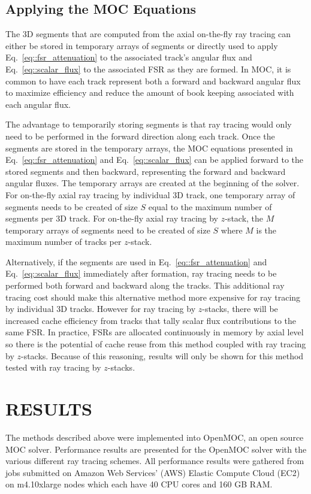 \subsection{Applying the MOC Equations}
The 3D segments that are computed from the axial on-the-fly ray tracing can either be stored in temporary arrays of segments or directly used to apply Eq.~\ref{eq::fsr_attenuation} to the associated track's angular flux and Eq.~\ref{eq::scalar_flux} to the associated FSR as they are formed. In MOC, it is common to have each track represent both a forward and backward angular flux to maximize efficiency and reduce the amount of book keeping associated with each angular flux. 

The advantage to temporarily storing segments is that ray tracing would only need to be performed in the forward direction along each track. Once the segments are stored in the temporary arrays, the MOC equations presented in Eq.~\ref{eq::fsr_attenuation} and Eq.~\ref{eq::scalar_flux} can be applied forward to the stored segments and then backward, representing the forward and backward angular fluxes. The temporary arrays are created at the beginning of the solver. For on-the-fly axial ray tracing by individual 3D track, one temporary array of segments needs to be created of size $S$ equal to the maximum number of segments per 3D track. For on-the-fly axial ray tracing by $z$-stack, the $M$ temporary arrays of segments need to be created of size $S$ where $M$ is the maximum number of tracks per $z$-stack.

Alternatively, if the segments are used in Eq.~\ref{eq::fsr_attenuation} and Eq.~\ref{eq::scalar_flux} immediately after formation, ray tracing needs to be performed both forward and backward along the tracks. This additional ray tracing cost should make this alternative method more expensive for ray tracing by individual 3D tracks. However for ray tracing by $z$-stacks, there will be increased cache efficiency from tracks that tally scalar flux contributions to the same FSR. In practice, FSRs are allocated continuously in memory by axial level so there is the potential of cache reuse from this method coupled with ray tracing by $z$-stacks. Because of this reasoning, results will only be shown for this method tested with ray tracing by $z$-stacks.

\section{RESULTS}

The methods described above were implemented into OpenMOC\cite{openmoc}, an open source MOC solver. Performance results are presented for the OpenMOC solver with the various different ray tracing schemes. All performance results were gathered from jobs submitted on Amazon Web Services' (AWS) Elastic Compute Cloud (EC2) on m4.10xlarge nodes which each have 40 CPU cores and 160 GB RAM.


